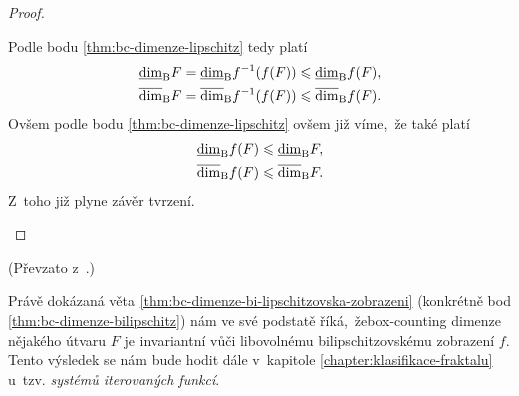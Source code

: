 \begin{proof}
\begin{enumerate}[label=\textit{(\roman*)}]
        Podle bodu \ref{thm:bc-dimenze-lipschitz} tedy platí
        \begin{align*}
            \underline{\dim}_\textup{B}{F}&=\underline{\dim}_\textup{B}{f^{-1}(f(F))}\leqslant\underline{\dim}_\textup{B}{f(F)},\\
            \overline{\dim}_\textup{B}{F}&=\overline{\dim}_\textup{B}{f^{-1}(f(F))}\leqslant\overline{\dim}_\textup{B}{f(F)}.
        \end{align*}
        Ovšem podle bodu \ref{thm:bc-dimenze-lipschitz} ovšem již víme,~že také platí
        \begin{align*}
            \underline{\dim}_\textup{B}{f(F)}&\leqslant\underline{\dim}_\textup{B}{F},\\
            \overline{\dim}_\textup{B}{f(F)}&\leqslant\overline{\dim}_\textup{B}{F}.
        \end{align*}
        Z~toho již plyne závěr tvrzení.
    \end{enumerate}
\end{proof}
(Převzato z~\citep[str. 36]{Falconer2014}.)

Právě dokázaná věta \ref{thm:bc-dimenze-bi-lipschitzovska-zobrazeni} (konkrétně bod \ref{thm:bc-dimenze-bilipschitz}) nám ve své podstatě říká,~že\linebreak{}box-counting dimenze nějakého útvaru $F$ je invariantní vůči libovolnému bilipschitzovskému zobrazení $f$. Tento výsledek se nám bude hodit dále v~kapitole \ref{chapter:klasifikace-fraktalu} u~tzv. \emph{systémů iterovaných funkcí}.